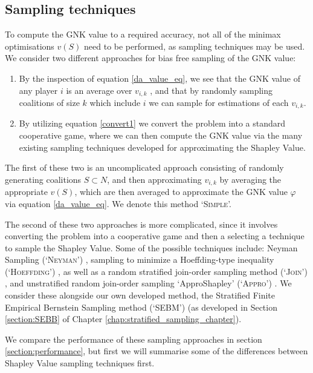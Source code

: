 \subsection{Sampling techniques}\label{sec:sampling_techniques}
To compute the GNK value to a required accuracy, not all of the minimax optimisations $v(S)$ need to be performed, as sampling techniques may be used.
We consider two different approaches for bias free sampling of the GNK value:
\begin{enumerate}
    \item By the inspection of equation \ref{da_value_eq}, we see that the GNK value of any player $i$ is an average over $v_{i,k}$%
, and that by randomly sampling coalitions of size $k$ which include $i$ we can sample for estimations of each $v_{i,k}$.
    \item By utilizing equation \ref{convert1} we convert the problem into a standard cooperative game, where we can then compute the GNK value via the many existing sampling techniques developed for approximating the Shapley Value.
\end{enumerate}

The first of these two is an uncomplicated approach consisting of randomly generating coalitions $S\subset N$, %
and then approximating $v_{i,k}$ by averaging the appropriate $v(S)$, which are then averaged to approximate the GNK value $\varphi$ via equation \ref{da_value_eq}. We denote this method `\textsc{Simple}'.

The second of these two approaches is more complicated, since it involves converting the problem into a cooperative game and then a selecting a technique to sample the Shapley Value.
Some of the possible techniques include: Neyman Sampling (`\textsc{Neyman}') \citep{CASTRO2017180,1938.10503378}, sampling to minimize a Hoeffding-type inequality (`\textsc{Hoeffding}') \citep{2013arXiv1306.4265M}, as well as a random stratified join-order sampling method (`\textsc{Join}') \citep{CASTRO2017180}, and unstratified random join-order sampling `ApproShapley' (`\textsc{Appro}') \citep{DBLP:journals/cor/CastroGT09}.
We consider these alongside our own developed method, the Stratified Finite Empirical Bernstein Sampling method (`SEBM') (as developed in Section \ref{section:SEBB} of Chapter \ref{chap:stratified_sampling_chapter}).

We compare the performance of these sampling approaches in section \ref{section:performance}, but first we will summarise some of the differences between Shapley Value sampling techniques first.

